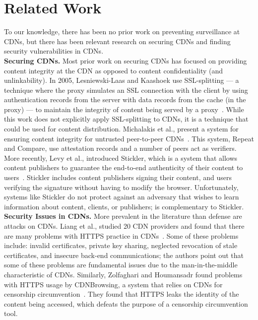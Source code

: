 \section{Related Work}
\label{sec:related}

To our knowledge, there has been no prior work on preventing surveillance at CDNs, but there 
has been relevant research on securing CDNs and finding security vulnerabilities in CDNs.\\
\vspace{0pt}
\textbf{Securing CDNs.} Most prior work on securing CDNs has focused on providing content 
integrity at the CDN as opposed to content confidentiality (and unlinkability).  In 2005, 
Lesniewski-Laas and Kaashoek use SSL-splitting --- a technique 
where the proxy simulates an SSL connection with the client by using authentication records from 
the server with data records from the cache (in the proxy) --- to maintain the 
integrity of content being served by a proxy~\cite{lesniewski2005ssl}.  While this work does not 
explicitly apply SSL-splitting to CDNs, it is a technique that could be used for content 
distribution.  Michalakis et al., present a system for ensuring content integrity for untrusted 
peer-to-peer CDNs~\cite{michalakis2007ensuring}.  This system, Repeat and 
Compare, use attestation records and a number of peers act as verifiers.  More recently, Levy et al., 
introduced Stickler, which is a system that allows content publishers to guarantee the end-to-end 
authenticity of their content to users~\cite{levy2015stickler}.  Stickler includes content publishers 
signing their content, and users verifying the signature without having to modify the browser.  Unfortunately, 
systems like Stickler do not protect against an adversary that wishes to learn information about content, clients, 
or publishers; \system{} is complementary to Stickler.\\
\vspace{0pt}
\textbf{Security Issues in CDNs.} More prevalent in the literature than defense are attacks on CDNs.  Liang et al., studied 
20 CDN providers and found that there are many problems with HTTPS practice in CDNs~\cite{liang2014https}.  Some of these 
problems include: invalid certificates, private key sharing, neglected revocation of stale certificates, and 
insecure back-end communications; the authors point out that some of these problems are fundamental issues due to 
the man-in-the-middle characteristic of CDNs.  Similarly, Zolfaghari and Houmansadr found problems with HTTPS usage by 
CDNBrowsing, a system that relies on CDNs for censorship circumvention~\cite{zolfaghari2016practical}.  They found that HTTPS 
leaks the identity of the content being accessed, which defeats the purpose of a censorship circumvention tool. 


